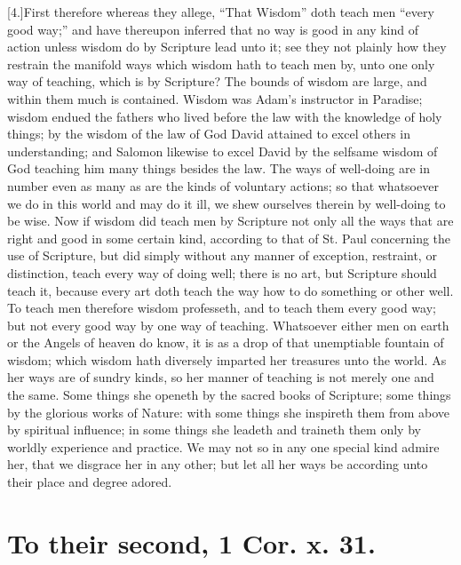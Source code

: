[4.]First therefore whereas they allege, “That Wisdom” doth teach men “every good way;” and have thereupon inferred that no way is good in any kind of action unless wisdom do by Scripture lead unto it; see they not plainly how they restrain the manifold ways which wisdom hath to teach men by, unto one only way of teaching, which is by Scripture? The bounds of wisdom are large, and within them much is contained. Wisdom was Adam’s instructor in Paradise; wisdom endued the fathers who lived before the law with the knowledge of holy things; by the wisdom of the law of God David attained to excel others in understanding; and Salomon likewise to excel David by the selfsame wisdom of God teaching him many things besides the law. The ways of well-doing are in number even as  many as are the kinds of voluntary actions; so that whatsoever we do in this world and may do it ill, we shew ourselves therein by well-doing to be wise. Now if wisdom did teach men by Scripture not only all the ways that are right and good in some certain kind, according to that of St. Paul concerning the use of Scripture, but did simply without any manner of exception, restraint, or distinction, teach every way of doing well; there is no art, but Scripture should teach it, because every art doth teach the way how to do something or other well. To teach men therefore wisdom professeth, and to teach them every good way; but not every good way by one way of teaching. Whatsoever either men on earth or the Angels of heaven do know, it is as a drop of that unemptiable fountain of wisdom; which wisdom hath diversely imparted her treasures unto the world. As her ways are of sundry kinds, so her manner of teaching is not merely one and the same. Some things she openeth by the sacred books of Scripture; some things by the glorious works of Nature: with some things she inspireth them from above by spiritual influence; in some things she leadeth and traineth them only by worldly experience and practice. We may not so in any one special kind admire her, that we disgrace her in any other; but let all her ways be according unto their place and degree adored.

\section*{To their second, 1 Cor. x. 31.}

